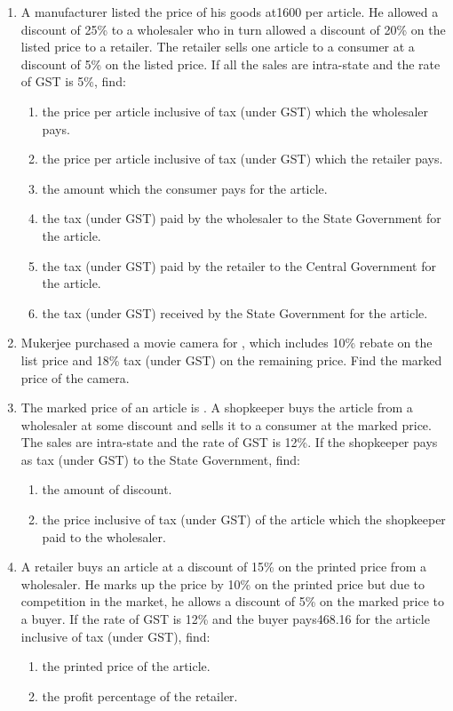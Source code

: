 \documentclass[12pt]{article}
\begin{document}
\begin{multicols}{2}
\begin{enumerate}[label=\textbf{\arabic*.}]
\item A manufacturer listed the price of his goods at1600 per article. He allowed a 
discount of 25\% to a wholesaler who in turn allowed a discount of 20\% on the listed 
price to a retailer. The retailer sells one article to a consumer at a discount of 5\% 
on the listed price. If all the sales are intra-state and the rate of GST is 5\%, find:
\begin{enumerate}[label=(\roman*)]
\item the price per article inclusive of tax (under GST) which the wholesaler pays.
\item the price per article inclusive of tax (under GST) which the retailer pays.
\item the amount which the consumer pays for the article.
\item the tax (under GST) paid by the wholesaler to the State Government for the article.
\item the tax (under GST) paid by the retailer to the Central Government for the article.
\item the tax (under GST) received by the State Government for the article.
\end{enumerate}

\item Mukerjee purchased a movie camera for , which includes 10\% rebate on the list 
price and 18\% tax (under GST) on the remaining price. Find the marked price of the camera.

\item The marked price of an article is . A shopkeeper buys the article from a wholesaler 
at some discount and sells it to a consumer at the marked price. The sales are intra-state 
and the rate of GST is 12\%. If the shopkeeper pays  as tax (under GST) to the State 
Government, find:
\begin{enumerate}[label=(\roman*)]
\item the amount of discount.
\item the price inclusive of tax (under GST) of the article which the shopkeeper paid 
to the wholesaler.
\end{enumerate}

\item A retailer buys an article at a discount of 15\% on the printed price from a wholesaler. 
He marks up the price by 10\% on the printed price but due to competition in the market, 
he allows a discount of 5\% on the marked price to a buyer. If the rate of GST is 12\% 
and the buyer pays468.16 for the article inclusive of tax (under GST), find:
\begin{enumerate}[label=(\roman*)]
\item the printed price of the article.
\item the profit percentage of the retailer.
\end{enumerate}
\end{enumerate}

\end{multicols}

\center{******************}	
\end{document}
